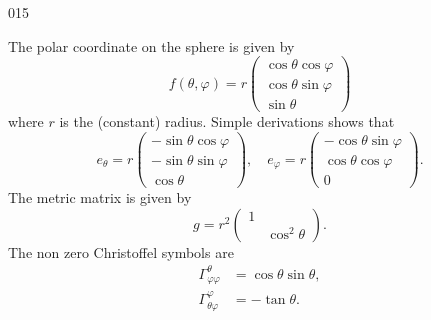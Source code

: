 \begin{corrige}{015}

The polar coordinate on the sphere is given by
\[ 
  f(\theta,\varphi)=r\begin{pmatrix}
\cos\theta\cos\varphi\\
\cos\theta\sin\varphi\\
\sin\theta
\end{pmatrix}
\]
where $r$ is the (constant) radius. Simple derivations shows that
\[ 
 e_{\theta}=r\begin{pmatrix}
-\sin\theta\cos\varphi\\
-\sin\theta\sin\varphi\\
\cos\theta
\end{pmatrix},\quad
e_{\varphi}=r\begin{pmatrix}
-\cos\theta\sin\varphi\\
\cos\theta\cos\varphi\\
0
\end{pmatrix}.  
\]
The metric matrix is given by
\[ 
  g=r^2\begin{pmatrix}
1\\
&\cos^2\theta
\end{pmatrix}.
\]
The non zero Christoffel symbols are
\begin{equation}
\begin{split}
  \Gamma_{\varphi\varphi}^{\theta}&=\cos\theta\sin\theta,\\
	\Gamma_{\theta\varphi}^{\varphi}&=-\tan\theta.
\end{split}
\end{equation}



\end{corrige}
